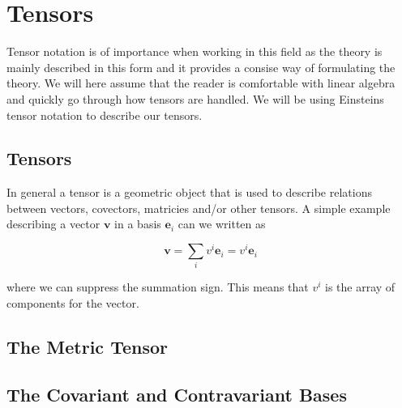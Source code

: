 \section{Tensors}

Tensor notation is of importance when working in this field as the theory is mainly described in this form and it provides a consise way of formulating the theory. We will here assume that the reader is comfortable with linear algebra and quickly go through how tensors are handled. We will be using Einsteins tensor notation to describe our tensors. 

\subsection{Tensors}

In general a tensor is a geometric object that is used to describe relations between vectors, covectors, matricies and/or other tensors. A simple example describing a vector $\mathbf{v}$ in a basis $\mathbf{e}_i$ can we written as

$$\mathbf{v}=\sum_i v^i \mathbf{e}_i=v^i \mathbf{e}_i$$

where we can suppress the summation sign. This means that $v^i$ is the array of components for the vector. 

\subsection{The Metric Tensor}
\subsection{The Covariant and Contravariant Bases}